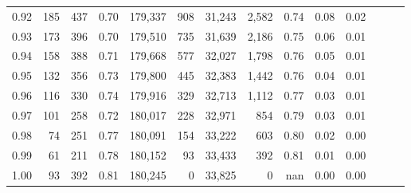 \begin{tabular}{rrrrrrrrrrrrrr}
0.92 &    185 &  437 &  0.70 &  179,337 &      908 &  31,243 &   2,582 &  0.74 &  0.08 &      0.02 \\
0.93 &    173 &  396 &  0.70 &  179,510 &      735 &  31,639 &   2,186 &  0.75 &  0.06 &      0.01 \\
0.94 &    158 &  388 &  0.71 &  179,668 &      577 &  32,027 &   1,798 &  0.76 &  0.05 &      0.01 \\
0.95 &    132 &  356 &  0.73 &  179,800 &      445 &  32,383 &   1,442 &  0.76 &  0.04 &      0.01 \\
0.96 &    116 &  330 &  0.74 &  179,916 &      329 &  32,713 &   1,112 &  0.77 &  0.03 &      0.01 \\
0.97 &    101 &  258 &  0.72 &  180,017 &      228 &  32,971 &     854 &  0.79 &  0.03 &      0.01 \\
0.98 &     74 &  251 &  0.77 &  180,091 &      154 &  33,222 &     603 &  0.80 &  0.02 &      0.00 \\
0.99 &     61 &  211 &  0.78 &  180,152 &       93 &  33,433 &     392 &  0.81 &  0.01 &      0.00 \\
1.00 &     93 &  392 &  0.81 &  180,245 &        0 &  33,825 &       0 &   nan &  0.00 &      0.00 \\
\bottomrule
\end{tabular}
